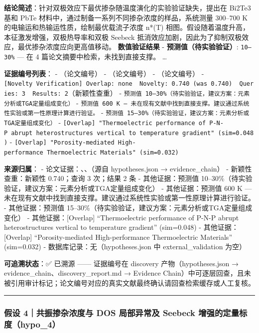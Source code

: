 \documentclass[12pt,a4paper]{ctexart}
\begin{document}
\textbf{结论简述}：针对双极效应下最优掺杂随温度演化的实验验证缺失，提出在 Bi2Te3 基和 PbTe 材料中，通过制备一系列不同掺杂浓度的样品，系统测量 300--700 K 的电输运和热输运性质，绘制最优载流子浓度 n*(T) 相图。假设随着温度升高，本征激发增强，双极热导率和双极 Seebeck 抵消效应加剧，因此为了抑制双极效应，最优掺杂浓度应向更高值移动。 \textbf{数值验证结果} - \textbf{预测值（待实验验证）}: \texttt{10–30\%} --- 在 4 篇论文摘要中检索，未找到直接支撑。 \ldots{}

\textbf{证据编号列表}： - \texttt{\cite{TE082}}（论文编号） - \texttt{\cite{TE085}}（论文编号） - \texttt{\cite{TE090}}（论文编号） - \texttt{{[}Novelty\ Verification{]}\ Overlap:\ none\ \textbar{}\ Novelty:\ 0.740\ (was\ 0.740)\ \textbar{}\ Queries:\ 3\ \textbar{}\ Results:\ 2}（新颖性查重） - \texttt{预测值\ 10–30\%（待实验验证，建议方案：元素分析或TGA定量组成变化）} - \texttt{预测值\ 600\ K\ —\ 未在现有文献中找到直接支撑。建议通过系统性实验或第一性原理计算进行验证。} - \texttt{预测值\ 15–30\%（待实验验证，建议方案：元素分析或TGA定量组成变化）} - \texttt{{[}Overlap{]}\ "Thermoelectric\ performance\ of\ P-N-P\ abrupt\ heterostructures\ vertical\ to\ temperature\ gradient"\ (sim=0.048)} - \texttt{{[}Overlap{]}\ "Porosity-mediated\ High-performance\ Thermoelectric\ Materials"\ (sim=0.032)}

\textbf{来源归属}： - 论文证据：\texttt{\cite{TE082}}、\texttt{\cite{TE085}}、\texttt{\cite{TE090}}（源自 hypotheses.json → evidence\_chain） - 新颖性查重：新颖性 0.740；查询 3 次；结果 2 条 - 其他证据：预测值 10--30\%（待实验验证，建议方案：元素分析或TGA定量组成变化） - 其他证据：预测值 600 K --- 未在现有文献中找到直接支撑。建议通过系统性实验或第一性原理计算进行验证。 - 其他证据：预测值 15--30\%（待实验验证，建议方案：元素分析或TGA定量组成变化） - 其他证据：{[}Overlap{]} ``Thermoelectric performance of P-N-P abrupt heterostructures vertical to temperature gradient'' (sim=0.048) - 其他证据：{[}Overlap{]} ``Porosity-mediated High-performance Thermoelectric Materials'' (sim=0.032) - 数据库记录：无（hypotheses.json 中 external\_validation 为空）

\textbf{可追溯状态}：✅ 已溯源 ------ 证据编号在 discovery 产物（hypotheses.json → evidence\_chain、discovery\_report.md → Evidence Chain）中可逐层回查，且未被引用审计标记；论文编号对应的真实文献最终确认请回查检索缓存或人工复核。

\begin{center}\rule{0.5\linewidth}{0.5pt}\end{center}

\subsubsection{假设 4｜共振掺杂浓度与 DOS 局部异常及 Seebeck 增强的定量标度（hypo\_4）}\label{ux5047ux8bbe-4ux5171ux632fux63baux6742ux6d53ux5ea6ux4e0e-dos-ux5c40ux90e8ux5f02ux5e38ux53ca-seebeck-ux589eux5f3aux7684ux5b9aux91cfux6807ux5ea6hypo_4}
\end{document}
